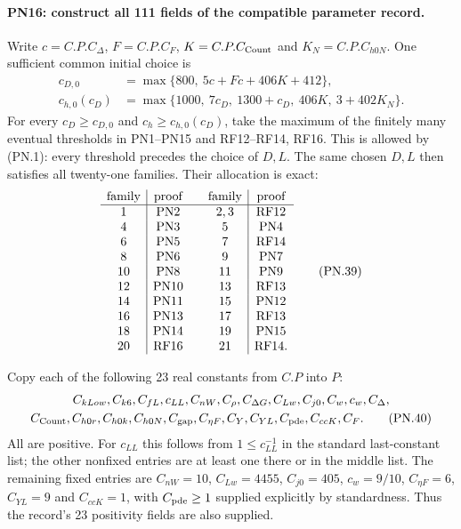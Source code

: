 \paragraph{PN16: construct all 111 fields of the compatible parameter record.}
Write $c=C.P.C_\Delta$, $F=C.P.C_F$, $K=C.P.C_{\rm Count}$ and
$K_N=C.P.C_{h0N}$. One sufficient common initial choice is
\begin{align*}
 c_{D,0}&=\max\{800,\ 5c+Fc+406K+412\},\\
 c_{h,0}(c_D)&=\max\{1000,\ 7c_D,\ 1300+c_D,\
                                 406K,\ 3+402K_N\}.
                                                               \tag{PN.38}
\end{align*}
For every $c_D\geq c_{D,0}$ and $c_h\geq c_{h,0}(c_D)$, take the
maximum of the finitely many eventual thresholds in PN1--PN15 and
RF12--RF14, RF16. This is allowed by (PN.1): every threshold precedes
the choice of $D,L$. The same chosen $D,L$ then satisfies all twenty-one
families. Their allocation is exact:
\[
\begin{array}{c|c@{\qquad}c|c}
 \text{family}&\text{proof}&\text{family}&\text{proof}\\ \hline
 1&\mathrm{PN2}&2,3&\mathrm{RF12}\\
 4&\mathrm{PN3}&5&\mathrm{PN4}\\
 6&\mathrm{PN5}&7&\mathrm{RF14}\\
 8&\mathrm{PN6}&9&\mathrm{PN7}\\
 10&\mathrm{PN8}&11&\mathrm{PN9}\\
 12&\mathrm{PN10}&13&\mathrm{RF13}\\
 14&\mathrm{PN11}&15&\mathrm{PN12}\\
 16&\mathrm{PN13}&17&\mathrm{RF13}\\
 18&\mathrm{PN14}&19&\mathrm{PN15}\\
 20&\mathrm{RF16}&21&\mathrm{RF14}.
\end{array}                                                   \tag{PN.39}
\]

Copy each of the following 23 real constants from $C.P$ into $P$:
\begin{gather*}
 C_{kLow},C_{k6},C_{fL},c_{LL},C_{nW},C_\rho,C_{\Delta G},
 C_{Lw},C_{j0},C_w,c_w,C_\Delta,\\
 C_{\rm Count},C_{h0r},C_{h0k},C_{h0N},C_{\rm gap},C_{\eta F},
 C_Y,C_{YL},C_{\rm pde},C_{ccK},C_F.
                                                               \tag{PN.40}
\end{gather*}
All are positive. For $c_{LL}$ this follows from
$1\leq c_{LL}^{-1}$ in the standard last-constant list; the other
nonfixed entries are at least one there or in the middle list.
The remaining fixed entries are
$C_{nW}=10$, $C_{Lw}=4455$, $C_{j0}=405$, $c_w=9/10$,
$C_{\eta F}=6$, $C_{YL}=9$ and $C_{ccK}=1$, with
$C_{\rm pde}\geq1$ supplied explicitly by standardness.
Thus the record's 23 positivity fields are also supplied.


